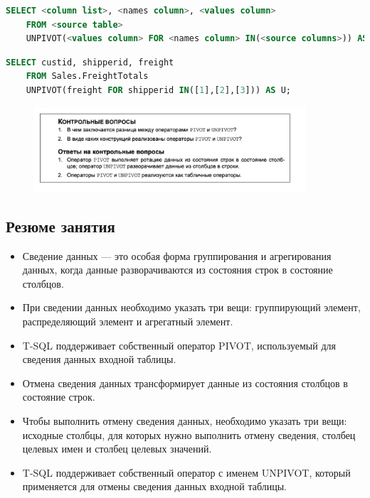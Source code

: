 \begin{lstlisting}[label=lst:funcReturn,  language=sql]
	SELECT <column list>, <names column>, <values column>
	FROM <source table>
	UNPIVOT(<values column> FOR <names column> IN(<source columns>)) AS U; 
\end{lstlisting}

\begin{lstlisting}[label=lst:funcReturn, language=sql]
	SELECT custid, shipperid, freight
	FROM Sales.FreightTotals
	UNPIVOT(freight FOR shipperid IN([1],[2],[3])) AS U; 
\end{lstlisting}


\begin{figure}[h!]
	\begin{center}
		\includegraphics[width=0.9\textwidth]{img/control15.png}
	\end{center}
	\captionsetup{justification=centering}
\end{figure}
		
\subsection*{Резюме занятия}
\begin{itemize}
	\item Сведение данных — это особая форма группирования и агрегирования данных,
	когда данные разворачиваются из состояния строк в состояние столбцов. 
	\item При сведении данных необходимо указать три вещи: группирующий элемент,
	распределяющий элемент и агрегатный элемент. 
	\item T-SQL поддерживает собственный оператор PIVOT, используемый для сведения
	данных входной таблицы. 
	\item Отмена сведения данных трансформирует данные из состояния столбцов в состояние строк. 
	\item Чтобы выполнить отмену сведения данных, необходимо указать три вещи: исходные столбцы, для которых нужно выполнить отмену сведения, столбец целевых имен и столбец целевых значений. 
	\item T-SQL поддерживает собственный оператор с именем UNPIVOT, который применяется для отмены сведения данных входной таблицы. 
\end{itemize}



